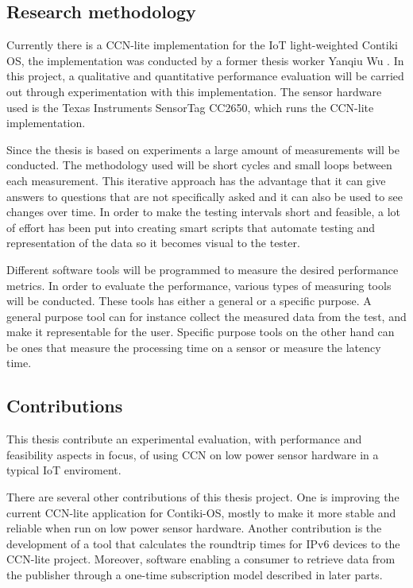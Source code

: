 \subsection{Research methodology}
Currently there is a  CCN-lite implementation for the IoT light-weighted Contiki OS, the implementation was conducted by a former thesis worker Yanqiu Wu \cite{yanqui}. In this project, a qualitative and quantitative performance evaluation will be carried out through experimentation with this implementation. The sensor hardware used is the Texas Instruments SensorTag CC2650, which runs the CCN-lite implementation. 

Since the thesis is based on experiments a large amount of measurements will be conducted. The methodology used will be short cycles and small loops between each measurement. This iterative approach has the advantage that it can give answers to questions that are not specifically asked and it can also be used to see changes over time. 
In order to make the testing intervals short and feasible, a lot of effort has been put into creating smart scripts that automate testing and representation of the data so it becomes visual to the tester. 

Different software tools will be programmed to measure the desired performance metrics. 
In order to evaluate the performance, various types of measuring tools will be conducted. These tools has either a general or a specific purpose. A general purpose tool can for instance collect the measured data from the test, and make it representable for the user. Specific purpose tools on the other hand can be ones that measure the processing time on a sensor or measure the latency time. 

\subsection{Contributions}

This thesis contribute an experimental evaluation, with performance and feasibility aspects in focus, of using CCN on low power sensor hardware in a typical IoT enviroment.

There are several other contributions of this thesis project. One is improving the current CCN-lite application for Contiki-OS, mostly to make it more stable and reliable when run on low power sensor hardware. Another contribution is the development of a tool that calculates the roundtrip times for IPv6 devices to the CCN-lite project. Moreover, software enabling a consumer to retrieve data from the publisher through a one-time subscription model described in later parts.

